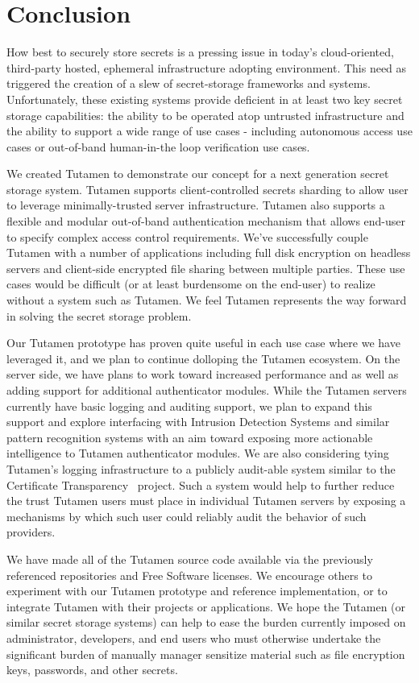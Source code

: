 \section{Conclusion}
\label{sec:conclusion}

How best to securely store secrets is a pressing issue in today's
cloud-oriented, third-party hosted, ephemeral infrastructure adopting
environment. This need as triggered the creation of a slew of
secret-storage frameworks and systems. Unfortunately, these existing
systems provide deficient in at least two key secret storage
capabilities: the ability to be operated atop untrusted infrastructure
and the ability to support a wide range of use cases - including
autonomous access use cases or out-of-band human-in-the loop
verification use cases.

We created Tutamen to demonstrate our concept for a next generation
secret storage system. Tutamen supports client-controlled secrets
sharding to allow user to leverage minimally-trusted server
infrastructure. Tutamen also supports a flexible and modular
out-of-band authentication mechanism that allows end-user to specify
complex access control requirements. We've successfully couple Tutamen
with a number of applications including full disk encryption on
headless servers and client-side encrypted file sharing between
multiple parties. These use cases would be difficult (or at least
burdensome on the end-user) to realize without a system such as
Tutamen. We feel Tutamen represents the way forward in solving the
secret storage problem.

Our Tutamen prototype has proven quite useful in each use case where
we have leveraged it, and we plan to continue dolloping the Tutamen
ecosystem. On the server side, we have plans to work toward increased
performance and as well as adding support for additional authenticator
modules. While the Tutamen servers currently have basic logging and
auditing support, we plan to expand this support and explore
interfacing with Intrusion Detection Systems and similar pattern
recognition systems with an aim toward exposing more actionable
intelligence to Tutamen authenticator modules. We are also considering
tying Tutamen's logging infrastructure to a publicly audit-able system
similar to the Certificate Transparency~\cite{laurie2013}
project. Such a system would help to further reduce the trust Tutamen
users must place in individual Tutamen servers by exposing a
mechanisms by which such user could reliably audit the behavior of
such providers.

We have made all of the Tutamen source code available via the
previously referenced repositories and Free Software licenses. We
encourage others to experiment with our Tutamen prototype and
reference implementation, or to integrate Tutamen with their projects
or applications. We hope the Tutamen (or similar secret storage
systems) can help to ease the burden currently imposed on
administrator, developers, and end users who must otherwise undertake
the significant burden of manually manager sensitize material such as
file encryption keys, passwords, and other secrets.

